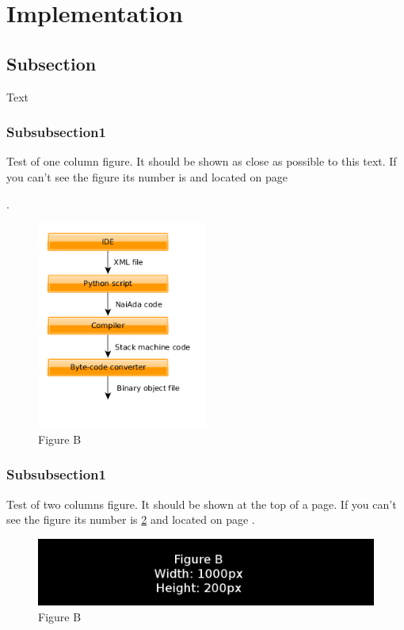 \section{Implementation}\label{sec:implementation}


\subsection{Subsection}
Text
\subsubsection{Subsubsection1}
Test of one column figure. It should be shown as close as possible to this
text. If you can't see the figure its number is 
and located on page 

\pageref{fig:another_column_figure}.
\begin{figure}[h]
    \includegraphics[width=0.5\textwidth]{./figure/figureMissionCreationToolchain.png}
    \caption{Figure B}
    \label{fig:another_column_figure}
\end{figure}

\subsubsection{Subsubsection1}
Test of two columns figure. It should be shown at the top of a page. If you
can't see the figure its number is \ref{fig:two_column_figure}
and located on page \pageref{fig:two_column_figure}.
\begin{figure}[t]
    \includegraphics[width=1.0\textwidth]{./figure/figureB.png}
    \caption{Figure B}
    \label{fig:two_column_figure}
\end{figure}
